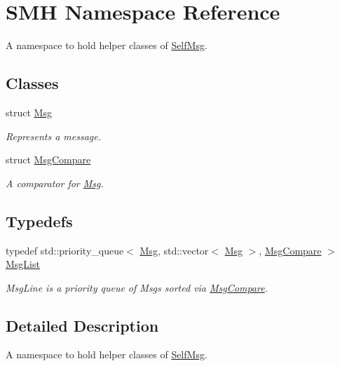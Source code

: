 \hypertarget{namespace_s_m_h}{}\section{S\+MH Namespace Reference}
\label{namespace_s_m_h}


A namespace to hold helper classes of \hyperlink{class_self_msg}{Self\+Msg}.  


\subsection*{Classes}
\begin{DoxyCompactItemize}
\item 
struct \hyperlink{struct_s_m_h_1_1_msg}{Msg}
\begin{DoxyCompactList}\small\item\em Represents a message. \end{DoxyCompactList}\item 
struct \hyperlink{struct_s_m_h_1_1_msg_compare}{Msg\+Compare}
\begin{DoxyCompactList}\small\item\em A comparator for \hyperlink{struct_s_m_h_1_1_msg}{Msg}. \end{DoxyCompactList}\end{DoxyCompactItemize}
\subsection*{Typedefs}
\begin{DoxyCompactItemize}
\item 
typedef std\+::priority\+\_\+queue$<$ \hyperlink{struct_s_m_h_1_1_msg}{Msg}, std\+::vector$<$ \hyperlink{struct_s_m_h_1_1_msg}{Msg} $>$, \hyperlink{struct_s_m_h_1_1_msg_compare}{Msg\+Compare} $>$ \hyperlink{namespace_s_m_h_a577a58a147f501590720badab28c2c98}{Msg\+List}
\begin{DoxyCompactList}\small\item\em Msg\+Line is a priority queue of Msgs sorted via \hyperlink{struct_s_m_h_1_1_msg_compare}{Msg\+Compare}. \end{DoxyCompactList}\end{DoxyCompactItemize}


\subsection{Detailed Description}
A namespace to hold helper classes of \hyperlink{class_self_msg}{Self\+Msg}. 

